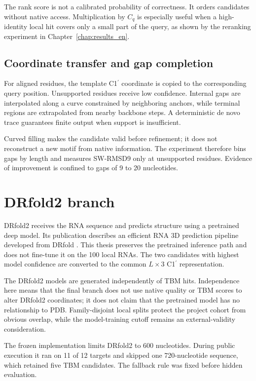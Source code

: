 \documentclass[12pt,a4paper,oneside]{report}
\newcommand{\cprime}{C1$^{\prime}$}
\begin{document}
The rank score is not a calibrated probability of correctness. It orders candidates
without native access. Multiplication by $C_q$ is especially useful when a high-identity
local hit covers only a small part of the query, as shown by the reranking experiment in
Chapter~\ref{chap:results_en}.

\subsection{Coordinate transfer and gap completion}

For aligned residues, the template \cprime{} coordinate is copied to the corresponding
query position. Unsupported residues receive low confidence. Internal gaps are
interpolated along a curve constrained by neighboring anchors, while terminal regions
are extrapolated from nearby backbone steps. A deterministic de novo trace guarantees
finite output when support is insufficient.

Curved filling makes the candidate valid before refinement; it does not reconstruct a
new motif from native information. The experiment therefore bins gaps by length and
measures SW-RMSD9 only at unsupported residues. Evidence of improvement is confined to
gaps of 9 to 20 nucleotides.

\section{DRfold2 branch}

DRfold2 receives the RNA sequence and predicts structure using a pretrained deep model.
Its publication describes an efficient RNA 3D prediction pipeline developed from DRfold
\cite{drfold,drfold2}. This thesis preserves the pretrained inference path and does not
fine-tune it on the 100 local RNAs. The two candidates with highest model confidence are
converted to the common $L\times3$ \cprime{} representation.

The DRfold2 models are generated independently of TBM hits. Independence here means that
the final branch does not use native quality or TBM scores to alter DRfold2 coordinates;
it does not claim that the pretrained model has no relationship to PDB. Family-disjoint
local splits protect the project cohort from obvious overlap, while the model-training
cutoff remains an external-validity consideration.

The frozen implementation limits DRfold2 to 600 nucleotides. During public execution it
ran on 11 of 12 targets and skipped one 720-nucleotide sequence, which retained five TBM
candidates. The fallback rule was fixed before hidden evaluation.
\end{document}
